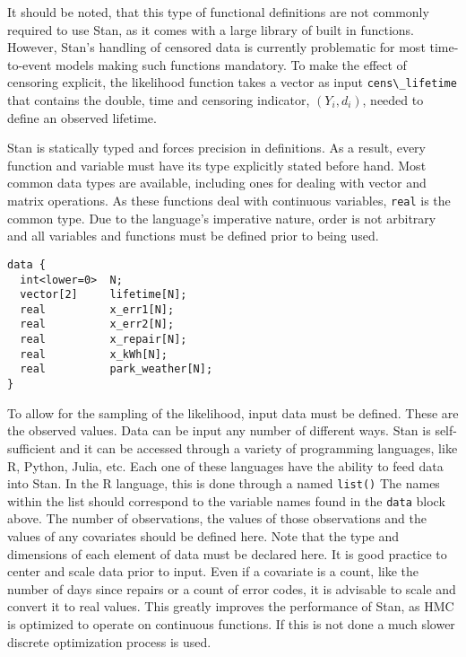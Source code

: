 It should be noted, that this type of functional definitions are not commonly required to use Stan, as it comes with a large library of built in functions\cite{StanDevelopmentTeam2016}. However, Stan's handling of censored data is currently problematic for most time-to-event models making such functions mandatory. To make the effect of censoring explicit, the likelihood function takes a vector as input \lstinline{cens\_lifetime} that contains the double, time and censoring indicator, $(Y_i,d_i)$, needed to define an observed lifetime. 

Stan is statically typed and forces precision in definitions. As a result, every function and variable must have its type explicitly stated before hand. Most common data types are available, including ones for dealing with vector and matrix operations. As these functions deal with continuous variables, \lstinline{real} is the common type. Due to the language's imperative nature, order is not arbitrary and all variables and functions must be defined prior to being used. 


\begin{lstlisting}
data {
  int<lower=0>  N;
  vector[2]     lifetime[N];
  real          x_err1[N];
  real          x_err2[N];
  real          x_repair[N];
  real          x_kWh[N];
  real          park_weather[N];
}
\end{lstlisting}


To allow for the sampling of the likelihood, input data must be defined. These are the observed values. Data can be input any number of different ways. Stan is self-sufficient and it can be accessed through a variety of programming languages, like R, Python, Julia, etc. Each one of these languages have the ability to feed data into Stan. In the R language, this is done through a named \lstinline{list()} The names within the list should correspond to the variable names found in the \lstinline{data} block above. The number of observations, the values of those observations and the values of any covariates should be defined here. Note that the type and dimensions of each element of data must be declared here. It is good practice to center and scale data prior to input. Even if a covariate is a count, like the number of days since repairs or a count of error codes, it is advisable to scale and convert it to real values. This greatly improves the performance of Stan, as HMC is optimized to operate on continuous functions. If this is not done a much slower discrete optimization process is used. 



